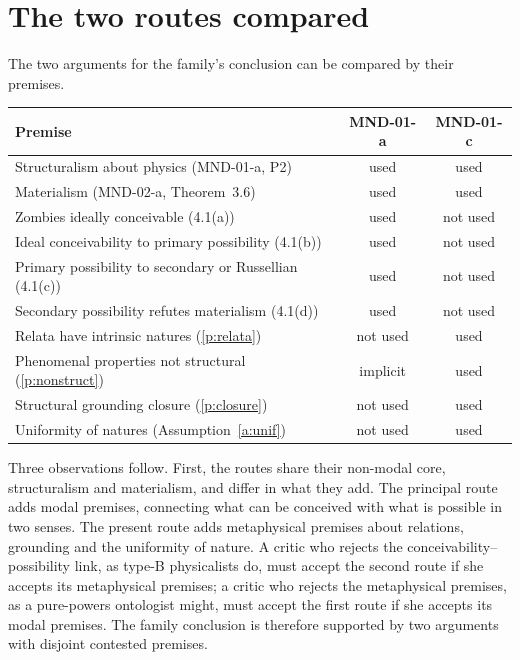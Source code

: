 \documentclass{situationist-preprint}
\begin{document}
\section{The two routes compared}\label{s:compare}

The two arguments for the family's conclusion can be compared by their premises.

\begin{center}\small
\begin{tabular}{@{}p{}cc@{}}
\toprule
Premise & MND-01-a & MND-01-c \\
\midrule
Structuralism about physics (MND-01-a, P2) & used & used \\
Materialism (MND-02-a, Theorem~3.6) & used & used \\
Zombies ideally conceivable (4.1(a)) & used & not used \\
Ideal conceivability to primary possibility (4.1(b)) & used & not used \\
Primary possibility to secondary or Russellian (4.1(c)) & used & not used \\
Secondary possibility refutes materialism (4.1(d)) & used & not used \\
Relata have intrinsic natures (\ref{p:relata}) & not used & used \\
Phenomenal properties not structural (\ref{p:nonstruct}) & implicit & used \\
Structural grounding closure (\ref{p:closure}) & not used & used \\
Uniformity of natures (Assumption~\ref{a:unif}) & not used & used \\
\bottomrule
\end{tabular}
\end{center}

Three observations follow. First, the routes share their non-modal core, structuralism and materialism, and differ in what they add. The principal route adds modal premises, connecting what can be conceived with what is possible in two senses. The present route adds metaphysical premises about relations, grounding and the uniformity of nature. A critic who rejects the conceivability--possibility link, as type-B physicalists do, must accept the second route if she accepts its metaphysical premises; a critic who rejects the metaphysical premises, as a pure-powers ontologist might, must accept the first route if she accepts its modal premises. The family conclusion is therefore supported by two arguments with disjoint contested premises.
\end{document}
